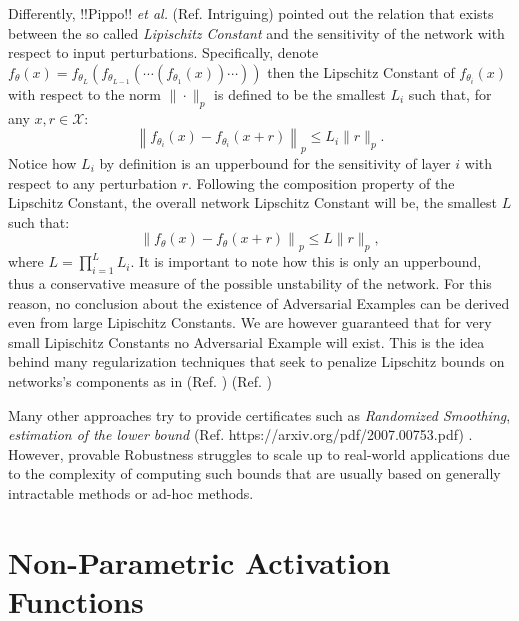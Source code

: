 \documentclass[LaM,binding=0.6cm]{./packages/sapthesis/sapthesis}
\begin{document}
            Differently, !!Pippo!! \textit{et al.} (Ref. Intriguing) pointed out the relation that exists 
            between the so called \textit{Lipischitz Constant} and the sensitivity of the network 
            with respect to input perturbations. Specifically, denote $f_{\theta}(x) = f_{\theta_L}(f_{\theta_{L-1}}(\cdots (f_{\theta_{1}}(x))\cdots)) $
            then the Lipschitz Constant of  $f_{\theta_i}(x)$ with respect to the norm $ \|\cdot\|_p $ is defined to be
            the smallest $L_i$ such that, for any $x, r \in \mathcal{X}$:
            \begin{equation}
                \label{LC}
                \left\|f_{\theta_i}\left(x \right)-f_{\theta_i}\left(x+r\right)\right\|_p \leq L_{i}\|r\|_p .
            \end{equation}
            Notice how $L_i$ by definition is an upperbound for the sensitivity of layer $i$ with respect
            to any perturbation $r$. Following the composition property of the
            Lipschitz Constant, the overall network Lipschitz Constant will be, the smallest $L$ such that:
            \begin{equation}
                \left\|f_{\theta}\left(x \right)-f_{\theta}\left(x+r\right)\right\|_p \leq L\|r\|_p,
            \end{equation}
            where $L=\prod_{i=1}^{L} L_{i}$. It is important to note how this is only an upperbound, thus a conservative
            measure of the possible unstability of the network. For this reason, no conclusion about the existence of 
            Adversarial Examples can be derived even from large Lipischitz Constants. We are however guaranteed 
            that for very small Lipischitz Constants no Adversarial Example will exist. This is the idea behind 
            many regularization techniques that seek to penalize Lipschitz bounds on networks's components as 
            in (Ref. ) (Ref. )

            Many other approaches try to provide certificates such as \textit{Randomized Smoothing}, \textit{estimation of the lower bound} (Ref. https://arxiv.org/pdf/2007.00753.pdf)
            . However, provable Robustness struggles to scale up to real-world applications
            due to the complexity of computing such bounds that are usually based on generally intractable methods or ad-hoc methods.





    \chapter{Non-Parametric Activation Functions}
\end{document}

